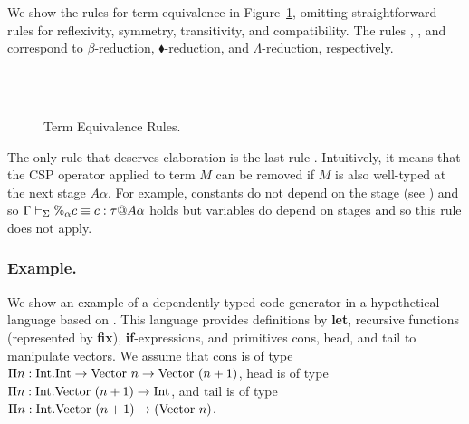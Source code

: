 We show the rules for term equivalence  in
Figure~\ref{fig:term-equivalence-rules}, omitting straightforward rules for
reflexivity, symmetry, transitivity, and compatibility.  The rules \QBeta,
\QTBLTB, and \QLambda{} correspond to $\beta$-reduction,
$\blacklozenge$-reduction, and $\Lambda$-reduction, respectively.

\begin{figure}[tbp]
    \begin{center}
    \\[2mm]
     \\[2mm]
     \hfil
    \caption{Term Equivalence Rules.}
    \label{fig:term-equivalence-rules}
  \end{center}
\end{figure}

The only rule that deserves elaboration is the last rule \QPercent.
Intuitively, it means that the CSP operator applied to term $M$ can be
removed if $M$ is also well-typed at the next stage \(A\alpha\).
For example, constants do not depend on the stage (see \TConst) and
so \(\Gamma\vdash_\Sigma \%_\alpha c \equiv c : \tau @ A\alpha\) holds but variables
do depend on stages and so this rule does not apply.

\subsubsection{Example.}

We show an example of a dependently typed code generator in a
hypothetical language based on \LTP.  
This language provides definitions by \textbf{let},
recursive functions (represented by \textbf{fix}), \textbf{if}-expressions,
and primitives cons, head, and tail to manipulate vectors. We assume that
$\text{cons}$ is of type $\Pi n:\textrm{Int}.\textrm{Int} \to \text{Vector}\ n \to \text{Vector}\ (n+1)$, 
$\text{head}$ is of type $\Pi n:\textrm{Int}.\text{Vector}\ (n+1) \to \textrm{Int}$, and
$\text{tail}$ is of type $\Pi n:\textrm{Int}.\text{Vector}\ (n+1) \to (\text{Vector}\ n)$.

